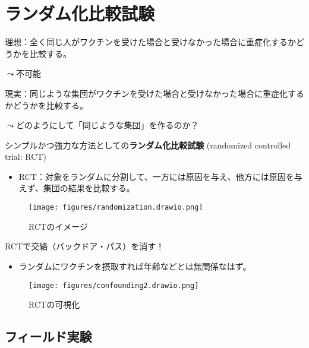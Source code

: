 \documentclass[
  xelatex,
  ja=standard]{bxjsarticle}
\providecommand{\tightlist}{%
  \setlength{\itemsep}{0pt}\setlength{\parskip}{0pt}}\usepackage{longtable,booktabs,array}
\begin{document}
\hypertarget{ux30e9ux30f3ux30c0ux30e0ux5316ux6bd4ux8f03ux8a66ux9a13}{%
\section{ランダム化比較試験}\label{ux30e9ux30f3ux30c0ux30e0ux5316ux6bd4ux8f03ux8a66ux9a13}}

理想：全く同じ人がワクチンを受けた場合と受けなかった場合に重症化するかどうかを比較する。

\(\leadsto\)不可能

現実：同じような集団がワクチンを受けた場合と受けなかった場合に重症化するかどうかを比較する。

\(\leadsto\)どのようにして「同じような集団」を作るのか？

シンプルかつ強力な方法としての\textbf{ランダム化比較試験} (randomized
controlled trial: RCT)

\begin{itemize}
\tightlist
\item
  RCT：対象をランダムに分割して、一方には原因を与え、他方には原因を与えず、集団の結果を比較する。
\end{itemize}

\begin{figure}[htpb]

{\centering \texttt{[image: figures/randomization.drawio.png]}

}

\caption{RCTのイメージ}

\end{figure}

RCTで交絡（バックドア・パス）を消す！

\begin{itemize}
\tightlist
\item
  ランダムにワクチンを摂取すれば年齢などとは無関係なはず。
\end{itemize}

\begin{figure}[htpb]

{\centering \texttt{[image: figures/confounding2.drawio.png]}

}

\caption{RCTの可視化}

\end{figure}

\hypertarget{ux30d5ux30a3ux30fcux30ebux30c9ux5b9fux9a13}{%
\subsection{フィールド実験}\label{ux30d5ux30a3ux30fcux30ebux30c9ux5b9fux9a13}}
\end{document}
